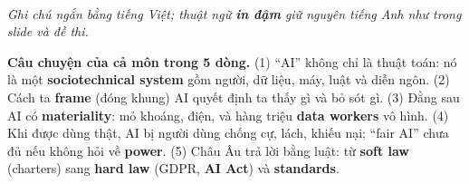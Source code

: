 \documentclass[10pt]{article}
\newcommand{\kw}[1]{\textbf{#1}}
\begin{document}
{\\[2pt]
{\itshape Ghi chú ngắn bằng tiếng Việt; thuật ngữ \textbf{in đậm} giữ nguyên tiếng Anh như trong slide và đề thi.}\par}
\vspace{4pt}
\textbf{Câu chuyện của cả môn trong 5 dòng.}
(1) ``AI'' không chỉ là thuật toán: nó là một \kw{sociotechnical system} gồm người, dữ liệu, máy, luật và diễn ngôn.
(2) Cách ta \kw{frame} (đóng khung) AI quyết định ta thấy gì và bỏ sót gì.
(3) Đằng sau AI có \kw{materiality}: mỏ khoáng, điện, và hàng triệu \kw{data workers} vô hình.
(4) Khi được dùng thật, AI bị người dùng chống cự, lách, khiếu nại; ``fair AI'' chưa đủ nếu không hỏi về \kw{power}.
(5) Châu Âu trả lời bằng luật: từ \kw{soft law} (charters) sang \kw{hard law} (GDPR, \kw{AI Act}) và \kw{standards}.
\end{document}
